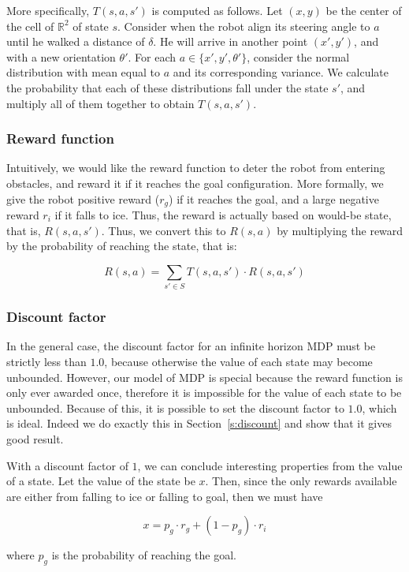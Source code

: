 \documentclass[a4paper]{article}
\begin{document}
More specifically, $T(s, a, s')$ is computed as follows. Let $(x, y)$ be the
center of the cell of $\mathbb{R}^2$ of state $s$. Consider when the robot
align its steering angle to $a$ until he walked a distance of $\delta$. He
will arrive in another point $(x', y')$, and with a new orientation $\theta'$.
For each $a \in \{x', y', \theta'\}$, consider the normal distribution
with mean equal to $a$ and its corresponding variance. We calculate the probability
that each of these distributions fall under the state $s'$, and multiply all
of them together to obtain $T(s, a, s')$.

\subsubsection{Reward function}
\label{sec:r}
Intuitively, we would like the reward function to deter the robot from entering
obstacles, and reward it if it reaches the goal configuration. More formally,
we give the robot positive reward ($r_g$) if it reaches the goal, and a large negative
reward $r_i$ if it falls to ice. Thus, the reward is actually based on would-be state,
that is, $R(s, a, s')$. Thus, we convert this to $R(s, a)$ by multiplying the
reward by the probability of reaching the state, that is:

\[ R(s, a) = \sum_{s' \in S} T(s, a, s') \cdot R(s, a, s') \]

\subsubsection{Discount factor}

In the general case, the discount factor for an infinite horizon MDP must be
strictly less than $1.0$, because otherwise the value of each state may become
unbounded. However, our model of MDP is special because the reward function is
only ever awarded once, therefore it is impossible for the value of each state
to be unbounded. Because of this, it is possible to set the discount factor to
$1.0$, which is ideal. Indeed we do exactly this in Section~\ref{s:discount}
and show that it gives good result.

With a discount factor of $1$, we can conclude interesting properties from the
value of a state. Let the value of the state be $x$. Then, since the only
rewards available are either from falling to ice or falling to goal, then we
must have

$$x = p_g \cdot r_g + (1 - p_g) \cdot r_i$$

where $p_g$ is the probability of reaching the goal.
\end{document}
